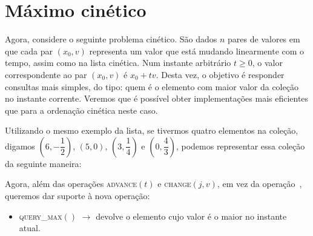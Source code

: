 
\chapter{Máximo cinético}
Agora, considere o seguinte problema cinético. São dados $n$ pares
de valores em que cada par $(x_0, v)$ representa um valor que está
mudando linearmente com o tempo, assim como na lista cinética. Num
instante arbitrário $t \geq 0$, o valor correspondente ao par $(x_0,
v)$ é $x_0 + tv$. Desta vez, o objetivo é responder consultas mais
simples, do tipo: quem é o elemento com maior valor da coleção no
instante corrente. Veremos que é possível obter implementações mais
eficientes que para a ordenação cinética neste caso.

Utilizando o mesmo exemplo da lista, se tivermos quatro elementos na
coleção, digamos $\left(6, -\dfrac{1}{2}\right)$, $(5, 0)$,
$\left(3, \dfrac{1}{4}\right)$ e $\left(0, \dfrac{4}{3}\right)$,
podemos representar essa coleção da seguinte maneira:



Agora, além das operações \textsc{advance}$(t)$ e
\textsc{change}$(j, v)$, em vez da operação~,
queremos dar suporte à nova operação:
\begin{itemize}
    \item \textsc{query\_max}$()$ $\rightarrow$ devolve o elemento
    cujo valor é o maior no instante atual.
\end{itemize}


